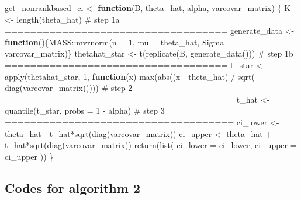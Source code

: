 \documentclass[
  12pt,
  a4paper,
]{article}
\newenvironment{Shaded}{\begin{snugshade}}{\end{snugshade}}
\newcommand{\AttributeTok}[1]{\textcolor[rgb]{0.00,0.34,0.68}{#1}}
\newcommand{\CommentTok}[1]{\textcolor[rgb]{0.54,0.53,0.53}{#1}}
\newcommand{\ControlFlowTok}[1]{\textcolor[rgb]{0.12,0.11,0.11}{\textbf{#1}}}
\newcommand{\DecValTok}[1]{\textcolor[rgb]{0.69,0.50,0.00}{#1}}
\newcommand{\FunctionTok}[1]{\textcolor[rgb]{0.39,0.29,0.61}{#1}}
\newcommand{\NormalTok}[1]{\textcolor[rgb]{0.12,0.11,0.11}{#1}}
\newcommand{\OtherTok}[1]{\textcolor[rgb]{0.00,0.43,0.16}{#1}}
\newcommand{\SpecialCharTok}[1]{\textcolor[rgb]{0.24,0.68,0.91}{#1}}
\numberwithin{equation}{section}
\begin{document}
\begin{Shaded}
\begin{Highlighting}[]
\NormalTok{get\_nonrankbased\_ci }\OtherTok{\textless{}{-}} \ControlFlowTok{function}\NormalTok{(B, }
\NormalTok{                                theta\_hat,}
\NormalTok{                                alpha, }
\NormalTok{                                varcovar\_matrix) \{}
\NormalTok{  K }\OtherTok{\textless{}{-}} \FunctionTok{length}\NormalTok{(theta\_hat)}
  \CommentTok{\# step 1a ===================================}
\NormalTok{  generate\_data }\OtherTok{\textless{}{-}} \ControlFlowTok{function}\NormalTok{()\{MASS}\SpecialCharTok{::}\FunctionTok{mvrnorm}\NormalTok{(}\AttributeTok{n =} \DecValTok{1}\NormalTok{,}
                                      \AttributeTok{mu =}\NormalTok{ theta\_hat,}
                                      \AttributeTok{Sigma =}\NormalTok{ varcovar\_matrix)\}}
\NormalTok{  thetahat\_star }\OtherTok{\textless{}{-}} \FunctionTok{t}\NormalTok{(}\FunctionTok{replicate}\NormalTok{(B, }\FunctionTok{generate\_data}\NormalTok{()))}
  \CommentTok{\# step 1b ===================================}
\NormalTok{  t\_star }\OtherTok{\textless{}{-}} \FunctionTok{apply}\NormalTok{(thetahat\_star, }
                  \DecValTok{1}\NormalTok{, }
                  \ControlFlowTok{function}\NormalTok{(x) }\FunctionTok{max}\NormalTok{(}\FunctionTok{abs}\NormalTok{((x }\SpecialCharTok{{-}}\NormalTok{ theta\_hat) }\SpecialCharTok{/} \FunctionTok{sqrt}\NormalTok{(}
                    \FunctionTok{diag}\NormalTok{(varcovar\_matrix)))))  }
  \CommentTok{\# step 2 ====================================}
\NormalTok{  t\_hat }\OtherTok{\textless{}{-}} \FunctionTok{quantile}\NormalTok{(t\_star, }\AttributeTok{probs =} \DecValTok{1} \SpecialCharTok{{-}}\NormalTok{ alpha)}
  \CommentTok{\# step 3 ====================================}
\NormalTok{  ci\_lower }\OtherTok{\textless{}{-}}\NormalTok{ theta\_hat }\SpecialCharTok{{-}}\NormalTok{ t\_hat}\SpecialCharTok{*}\FunctionTok{sqrt}\NormalTok{(}\FunctionTok{diag}\NormalTok{(varcovar\_matrix))}
\NormalTok{  ci\_upper }\OtherTok{\textless{}{-}}\NormalTok{ theta\_hat }\SpecialCharTok{+}\NormalTok{ t\_hat}\SpecialCharTok{*}\FunctionTok{sqrt}\NormalTok{(}\FunctionTok{diag}\NormalTok{(varcovar\_matrix))}
  \FunctionTok{return}\NormalTok{(}\FunctionTok{list}\NormalTok{(}
    \AttributeTok{ci\_lower =}\NormalTok{ ci\_lower,}
    \AttributeTok{ci\_upper =}\NormalTok{ ci\_upper}
\NormalTok{  ))}
\NormalTok{\} }
\end{Highlighting}
\end{Shaded}

\subsection*{Codes for algorithm 2}\label{codes-for-algorithm-2}
\end{document}
